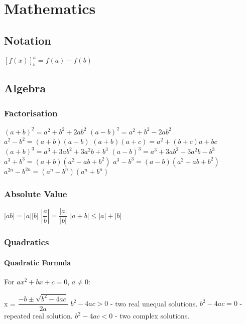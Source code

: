 \chapter{Mathematics}



	\section{Notation}
\begin{itemize}
\itemt \( [f(x)]^a_b = f(a) - f(b)\)
\end{itemize}


	\section{Algebra}

\subsection{Factorisation}
\begin{itemize}
\itemt \( (a+b)^2 = a^2 + b^2 + 2ab^2 \)
\itemt \( (a-b)^2 = a^2 + b^2 - 2ab^2 \)
\itemt \( a^2-b^2 = (a+b)(a-b) \)
\itemt \( (a+b)(a+c) = a^2 + (b+c)a + bc \)
\itemt \( (a+b)^3 = a^3 +3ab^2 + 3a^2b + b^3 \)
\itemt \( (a-b)^3 = a^3 + 3ab^2 - 3a^2b - b^3 \)
\itemt \( a^3 + b^3 = (a+b)(a^2-ab+b^2) \)
\itemt \( a^3 - b^3 = (a-b)(a^2 + ab + b^2) \)
\itemt \( a^{2n} - b^{2n} = (a^n - b^n)(a^n + b^n) \)
\end{itemize}

\subsection{Absolute Value}
\begin{itemize}
\itemt \( |ab|=|a||b| \)
\itemt \( |\dfrac{a}{b}| = \dfrac{|a|}{|b|} \)
\itemt \( |a+b| \leq |a|+|b| \)
\end{itemize}

\subsection{Quadratics}

\subsubsection{Quadratic Formula}
For $ax^2 + bx + c = 0$, $a\neq 0$:
\begin{itemize}
\itemt x = \( \dfrac{-b \pm \sqrt{b^2 - 4ac}}{2a} \)
\itemt \( b^2 - 4ac > 0 \) - two real unequal solutions.
\itemt \( b^2 - 4ac = 0 \) - repeated real solution.
\itemt \( b^2 - 4ac < 0 \) - two complex solutions.
\end{itemize}

